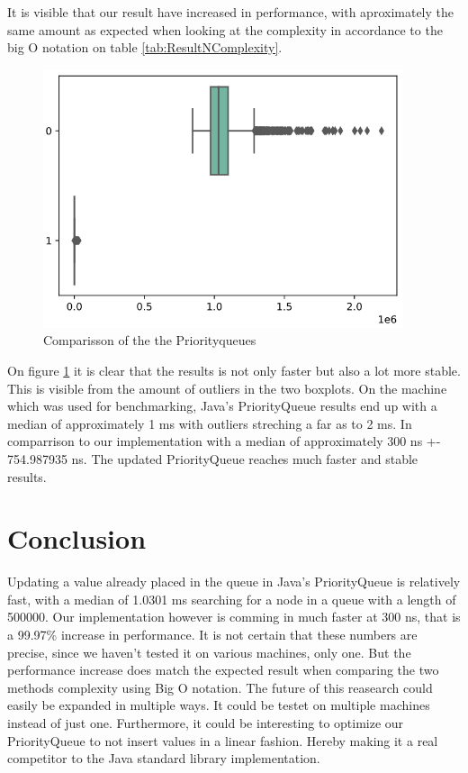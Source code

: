 \documentclass{article}
\begin{document}
It is visible that our result have increased in performance, with aproximately the same amount as expected when looking at the complexity in accordance to the big O notation on table \ref{tab:ResultNComplexity}.



\begin{figure}[H]
\includegraphics[width=300pt]{boxplot_comparisson}
\caption{Comparisson of the the Priorityqueues}
\label{img:boxplot_comparisson}
\end{figure}

On figure \ref{img:boxplot_comparisson} it is clear that the results is not only faster 
but also a lot more stable. This is visible from the amount of outliers in the two boxplots. 
On the machine which was used for benchmarking, Java's PriorityQueue results end up with a
median of approximately 1 ms with outliers streching a far as to 2 ms. In comparrison to 
our implementation with a median of approximately 300 ns +- 754.987935 ns. The updated 
PriorityQueue reaches much faster and stable results.  

\section{Conclusion} %
Updating a value already placed in the queue in Java's PriorityQueue is relatively
fast, with a median of 1.0301 ms searching for a node in a queue with a length of 
500000. Our implementation however is comming in much faster at 300 ns, that is a 99.97\% 
increase in performance. It is not certain that these numbers are precise, since we haven't 
tested it on various machines, only one. But the performance increase does match the expected result 
when comparing the two methods complexity using Big O notation. 
The future of this reasearch could easily be expanded in multiple ways.
It could be testet on multiple machines instead of just one. Furthermore, it could be interesting
to optimize our PriorityQueue to not insert values in a linear fashion. Hereby making it a 
real competitor to the Java standard library implementation.




\end{document}
